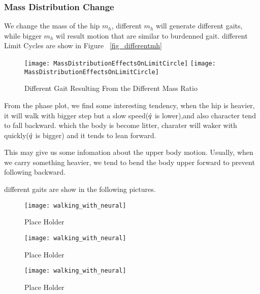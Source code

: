 \subsubsection*{Mass Distribution Change}
We change the mass of the hip $m_h$, different $m_h$ will generate different gaits, while bigger $m_h$ wil result motion that are similar to burdenned gait.
different Limit Cycles are show in Figure ~\ref{fig_differentmh}
\begin{figure}[!htbp]
  \begin{center}
    \leavevmode
    \ifpdf
      \texttt{[image: MassDistributionEffectsOnLimitCircle]}
    \else
      \texttt{[image: MassDistributionEffectsOnLimitCircle]}
    \fi
    \caption{Different Gait Resulting From the Different Mass Ratio}
    \label{fig:differentmh}
\end{center}
\end{figure}

From the phase plot, we find some interesting tendency,
when the hip is heavier, it will walk with bigger step but a slow speed($\dot{q}$ is lower),and also character tend to fall backward.
which the body is become litter, charater will waker with quickly($\dot{q}$ is bigger) and it tends to lean forward.

This may give us some infomation about the upper body motion.
Usually, when we carry something heavier, we  tend to bend the body upper forward to prevent following backward.

different gaits are show in the following pictures.
\begin{figure}[!htbp]
  \begin{center}
      \texttt{[image: walking\_with\_neural]}
    \caption{Place Holder}
    \label{fig:massh1}
\end{center}
\end{figure}

\begin{figure}[!htbp]
  \begin{center}
      \texttt{[image: walking\_with\_neural]}
    \caption{Place Holder}
    \label{fig:massh2}
\end{center}
\end{figure}

\begin{figure}[!htbp]
  \begin{center}
      \texttt{[image: walking\_with\_neural]}
    \caption{Place Holder}
    \label{fig:massh3}
\end{center}
\end{figure}

